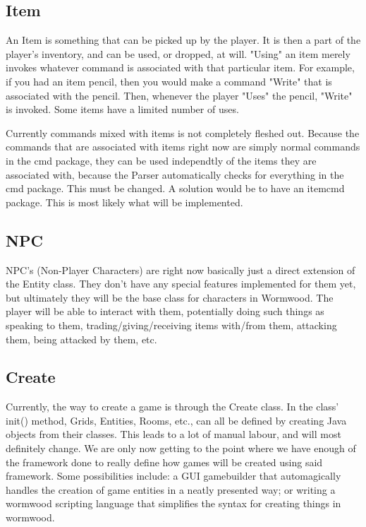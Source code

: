 \documentclass[12pt]{report}
\begin{document}
\subsection{Item}
An Item is something that can be picked up by the player. It is then a part of
the player's inventory, and can be used, or dropped, at will. "Using" an item
merely invokes whatever command is associated with that particular item. For
example, if you had an item pencil, then you would make a command "Write" that
is associated with the pencil. Then, whenever the player "Uses" the pencil,
"Write" is invoked. Some items have a limited number of uses.

Currently commands mixed with items is not completely fleshed out. Because 
the commands that are associated with items right now are simply normal 
commands in the cmd package, they can be used independtly of the items they
are associated with, because the Parser automatically checks for everything
in the cmd package. This must be changed. A solution would be to have an
itemcmd package. This is most likely what will be implemented.

\subsection{NPC}
NPC's (Non-Player Characters) are right now basically just a direct extension of the Entity class.
They don't have any special features implemented for them yet, but ultimately
they will be the base class for characters in Wormwood. The player will be
able to interact with them, potentially doing such things as speaking to them,
trading/giving/receiving items with/from them, attacking them, being attacked
by them, etc.

\subsection{Create}
Currently, the way to create a game is through the Create class. In the class'
init() method, Grids, Entities, Rooms, etc., can all be defined by creating
Java objects from their classes. This leads to a lot of manual labour, and
will most definitely change. We are only now getting to the point where
we have enough of the framework done to really define how games will be 
created using said framework. Some possibilities include: a GUI
gamebuilder that automagically handles the creation of game entities in 
a neatly presented way; or writing a wormwood scripting language that simplifies
the syntax for creating things in wormwood. 
\end{document}
